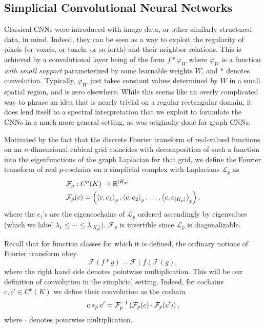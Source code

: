 \subsection{Simplicial Convolutional Neural Networks}

Classical CNNs were introduced with image data, or other similarly structured data, in mind. Indeed, they can be seen as a way to exploit the regularity of pixels (or voxels, or toxels, or so forth) and their neighbor relations. This is achieved by a convolutional layer being of the form $f\ast \varphi_W$ where $\varphi_W$ is a function \emph{with small support} parameterized by some learnable weights $W$, and $\ast$ denotes convolution. Typically, $\varphi_W$ just takes constant values determined by $W$ in a small spatial region, and is zero elsewhere. While this seems like an overly complicated way to phrase an idea that is nearly trivial on a regular rectangular domain, it does lend itself to a spectral interpretation that we exploit to formulate the CNNs in a much more general setting, as was originally done for graph CNNs.

Motivated by the fact that the discrete Fourier transform of real-valued functions on an $n$-dimensional cubical grid coincides with decomposition of such a function into the eigenfunctions of the graph Laplacian for that grid, we define the Fourier transform of real $p$-cochains on a simplicial complex with Laplacians $\mathcal{L}_p$ as
\begin{align*}
  &\mathcal{F}_p: C^p(K) \to \mathbb{R}^{\lvert K_p \rvert} \\
  &\mathcal{F}_p(c) = \left(\left\langle c , e_1 \right\rangle_p, \left\langle c , e_2 \right\rangle_p, \dotsc, \left\langle c , e_{\lvert K_p \rvert} \right\rangle_p\right),
\end{align*}
where the $e_i$'s are the eigencochains of $\mathcal{L}_p$ ordered ascendingly by eigenvalues (which we label $\lambda_1\leq\dotsm\leq\lambda_{\lvert K_p \rvert}$). $\mathcal{F}_p$ is invertible since $\mathcal{L}_p$ is diagonalizable.

Recall that for function classes for which it is defined, the ordinary notions of Fourier transform obey
\begin{equation*}
  \mathcal{F}(f\ast g)=\mathcal{F}(f)\mathcal{F}(g),
\end{equation*}
where the right hand side denotes pointwise multiplication. This will be our definition of convolution in the simplicial setting. Indeed, for cochains $c,c'\in C^p(K)$ we define their convolution as the cochain
\begin{equation*}
  c\ast_p c' = \mathcal{F}_p^{-1}\left(\mathcal{F}_p(c)\cdot\mathcal{F}_p(c')\right),
\end{equation*}
where $\cdot$ denotes pointwise multiplication.

